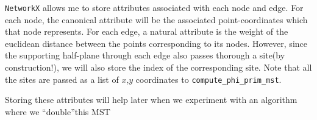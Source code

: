 \documentclass[11.5pt]{report}
\begin{document}
\begin{center}
\end{center}
\label{fig:animating-growth-of-phi-prim-mst}

\newchunk \verb|NetworkX| allows me to store attributes associated with each node 
and edge. For each node, the canonical attribute will be the associated point-coordinates 
which that node represents. For each edge, a natural attribute is the weight of the 
euclidean distance between the points corresponding to its nodes. However, since the 
supporting half-plane through each edge also passes thorough a site(by construction!), 
we will also store the index of the corresponding site. Note that all the sites are passed 
as a list of $x$,$y$ coordinates to \verb|compute_phi_prim_mst|. 

Storing these attributes will help later when we experiment with an algorithm where 
we ``double''this MST
\end{document}
